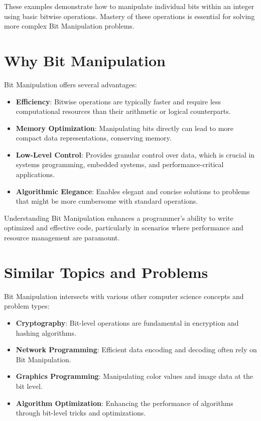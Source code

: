 These examples demonstrate how to manipulate individual bits within an integer using basic bitwise operations. Mastery of these operations is essential for solving more complex Bit Manipulation problems.

\section*{Why Bit Manipulation}

Bit Manipulation offers several advantages:

\begin{itemize}
    \item \textbf{Efficiency}: Bitwise operations are typically faster and require less computational resources than their arithmetic or logical counterparts.
    \item \textbf{Memory Optimization}: Manipulating bits directly can lead to more compact data representations, conserving memory.
    \item \textbf{Low-Level Control}: Provides granular control over data, which is crucial in systems programming, embedded systems, and performance-critical applications.
    \item \textbf{Algorithmic Elegance}: Enables elegant and concise solutions to problems that might be more cumbersome with standard operations.
\end{itemize}

Understanding Bit Manipulation enhances a programmer’s ability to write optimized and effective code, particularly in scenarios where performance and resource management are paramount.

\section*{Similar Topics and Problems}

Bit Manipulation intersects with various other computer science concepts and problem types:

\begin{itemize}
    \item \textbf{Cryptography}: Bit-level operations are fundamental in encryption and hashing algorithms.
    \item \textbf{Network Programming}: Efficient data encoding and decoding often rely on Bit Manipulation.
    \item \textbf{Graphics Programming}: Manipulating color values and image data at the bit level.
    \item \textbf{Algorithm Optimization}: Enhancing the performance of algorithms through bit-level tricks and optimizations.
\end{itemize}

